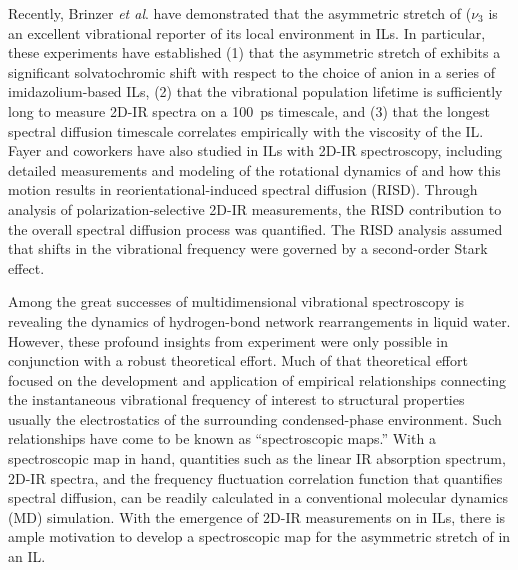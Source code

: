 \documentclass[%
  class = book,%
  crop = false,%
  float = true,%
  multi = true,%
  preview = false,%
]{standalone}
\begin{document}
Recently, Brinzer \emph{et al}. have demonstrated that the asymmetric stretch of  (\(\nu_3\) is an excellent vibrational reporter of its local environment in ILs.\cite{Brinzer2015} In particular, these experiments have established (1) that the asymmetric stretch of  exhibits a significant solvatochromic shift with respect to the choice of anion in a series of imidazolium-based ILs, (2) that the  vibrational population lifetime is sufficiently long to measure 2D-IR spectra on a \SI{100}{\pico\second} timescale, and (3) that the longest spectral diffusion timescale correlates empirically with the viscosity of the IL.\cite{Brinzer2015} Fayer and coworkers have also studied  in ILs with 2D-IR spectroscopy, including detailed measurements and modeling of the rotational dynamics of  and how this motion results in reorientational-induced spectral diffusion (RISD). Through analysis of polarization-selective 2D-IR measurements, the RISD contribution to the overall spectral diffusion process was quantified.\cite{Giammanco2016d,Giammanco2016} The RISD analysis assumed that shifts in the  vibrational frequency were governed by a second-order Stark effect.

Among the great successes of multidimensional vibrational spectroscopy is revealing the dynamics of hydrogen-bond network rearrangements in liquid water.\cite{asburyJCP-04,Asbury2004,Bakker2010,feckoSci-03,eavesPNAS-05,Gruenbaum2013,Jansen2010,loparoJCP-06a,loparoJCP-06b,Nibbering2004,Nicodemus2011,nicodemusJPCL-10,ramaseshaJCP-11,Roberts2009} However, these profound insights from experiment were only possible in conjunction with a robust theoretical effort.\cite{Lee2011,feckoSci-03,eavesPNAS-05,Gruenbaum2013,auer_hydrogen_2007,auer_ir_2008,corcelliJCP-04a,Hayashi2005,Jansen2009,Li2010,Chai2008,lin_water_2009-1,Paarmann2009,Pieniazek2009,shiJPCB-12,Skinner2009,Tainter2012,Yang2011,laageCPL-06,Laage2006,Laage2008,Laage2012,Laage2012a,Smith2005} Much of that theoretical effort focused on the development and application of empirical relationships connecting the instantaneous vibrational frequency of interest to structural properties \textemdash{} usually the electrostatics \textemdash{} of the surrounding condensed-phase environment.\cite{steinelCPL-04,auer_ir_2008,Li2006} Such relationships have come to be known as ``spectroscopic maps.'' With a spectroscopic map in hand, quantities such as the linear IR absorption spectrum, 2D-IR spectra, and the frequency fluctuation correlation function that quantifies spectral diffusion, can be readily calculated in a conventional molecular dynamics (MD) simulation.\cite{lin_water_2009-1,Li2006,Terranova2014} With the emergence of 2D-IR measurements on  in ILs, there is ample motivation to develop a spectroscopic map for the asymmetric stretch of  in an IL.
\end{document}
